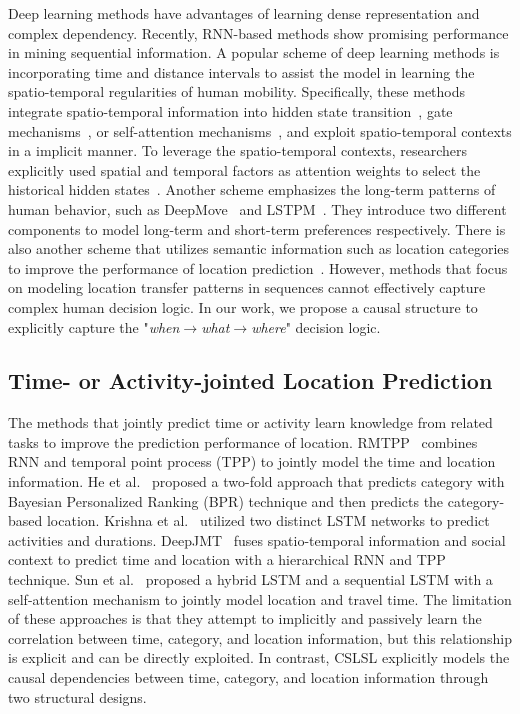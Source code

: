 \documentclass[sigconf]{acmart}
\begin{document}
    Deep learning methods have advantages of learning dense representation and complex dependency. Recently, RNN-based methods show promising performance in mining sequential information. A popular scheme of deep learning methods is incorporating time and distance intervals to assist the model in learning the spatio-temporal regularities of human mobility. 
    Specifically, these methods integrate spatio-temporal information into hidden state transition~\cite{liu2016predicting}, gate mechanisms~\cite{kong2018hst,manotumruksa2018contextual,zhao2019go}, or self-attention mechanisms~\cite{lian2020geography,luo2021stan}, and exploit spatio-temporal contexts in a implicit manner. 
    To leverage the spatio-temporal contexts, researchers explicitly used spatial and temporal factors as attention weights to select the historical hidden states~\cite{yang2020location,zhao2020discovering}. 
    Another scheme emphasizes the long-term patterns of human behavior, such as DeepMove~\cite{feng2018deepmove} and LSTPM~\cite{sun2020go}. They introduce two different components to model long-term and short-term preferences respectively. 
    There is also another scheme that utilizes semantic information such as location categories to improve the performance of location prediction~\cite{yu2020category,guo2020attentional,wang2021spatio}.
    However, methods that focus on modeling location transfer patterns in sequences cannot effectively capture complex human decision logic. 
    In our work, we propose a causal structure to explicitly capture the "\textit{when$\rightarrow$what$\rightarrow$where}" decision logic.
    
    
\subsection{Time- or Activity-jointed Location Prediction}
    The methods that jointly predict time or activity learn knowledge from related tasks to improve the prediction performance of location.
    RMTPP~\cite{du2016recurrent} combines RNN and temporal point process (TPP) to jointly model the time and location information. He et al.~\cite{he2017category} proposed a two-fold approach that predicts category with Bayesian Personalized Ranking (BPR) technique and then predicts the category-based location. Krishna et al.~\cite{krishna2018lstm} utilized two distinct LSTM networks to predict activities and durations. DeepJMT~\cite{chen2020context} fuses spatio-temporal information and social context to predict time and location with a hierarchical RNN and TPP technique. Sun et al.~\cite{sun2021joint} proposed a hybrid LSTM and a sequential LSTM with a self-attention mechanism to jointly model location and travel time.  
    The limitation of these approaches is that they attempt to implicitly and passively learn the correlation between time, category, and location information, but this relationship is explicit and can be directly exploited. In contrast, CSLSL explicitly models the causal dependencies between time, category, and location information through two structural designs.   
   
\end{document}
